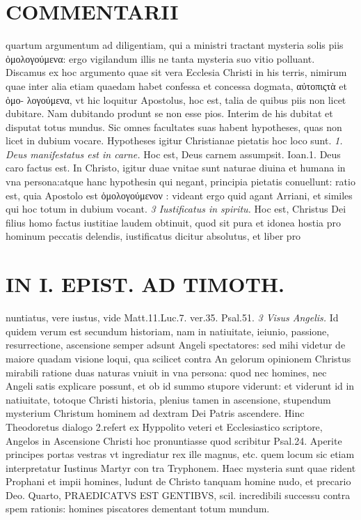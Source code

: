 \documentclass{article}
\begin{document}
\begin{pages}
\section*{COMMENTARII }
\marginpar{[ p.80 ]}\pstart quartum argumentum ad diligentiam, qui a ministri tractant mysteria solis piis ὁμολογούμενα: ergo vigilandum illis ne tanta mysteria suo vitio polluant. Discamus ex hoc argumento quae sit vera Ecclesia Christi in his terris, nimirum quae inter alia etiam quaedam habet confessa et concessa dogmata, αὐτοπιςτὰ et ὁμο- λογούμενα, vt hic loquitur Apostolus, hoc est, talia de quibus piis non licet dubitare. Nam dubitando produnt se non esse pios. Interim de his dubitat et disputat totus mundus. Sic omnes facultates suas habent hypotheses, quas non licet in dubium vocare. Hypotheses igitur Christianae pietatis hoc loco sunt.  \pend
\textit{1. Deus manifestatus est in carne. }\pstart Hoc est, Deus carnem assumpsit. Ioan.1. Deus caro factus est. In Christo, igitur duae vnitae sunt naturae diuina et humana in vna persona:atque hanc hypothesin qui negant, principia pietatis conuellunt: ratio est, quia Apostolo est ὁμολογούμενον : videant ergo quid agant Arriani, et similes qui hoc totum in dubium vocant.  \pend
\textit{3 Iustificatus in spiritu. }\pstart Hoc est, Christus Dei filius homo factus iustitiae laudem obtinuit, quod sit pura et idonea hostia pro hominum peccatis delendis, iustificatus dicitur absolutus, et liber pro\pend
\section*{IN I. EPIST. AD TIMOTH. }
\marginpar{[ p.81 ]}\pstart nuntiatus, vere iustus, vide Matt.11.Luc.7. ver.35. Psal.51.  \pend
\textit{3 Visus Angelis. }\pstart Id quidem verum est secundum historiam, nam in natiuitate, ieiunio, passione, resurrectione, ascensione semper adsunt Angeli spectatores: sed mihi videtur de maiore quadam visione loqui, qua scilicet contra An gelorum opinionem Christus mirabili ratione duas naturas vniuit in vna persona: quod nec homines, nec Angeli satis explicare possunt, et ob id summo stupore viderunt: et viderunt id in natiuitate, totoque Christi historia, plenius tamen in ascensione, stupendum mysterium Christum hominem ad dextram Dei Patris ascendere. Hinc Theodoretus dialogo 2.refert ex Hyppolito veteri et Ecclesiastico scriptore, Angelos in Ascensione Christi hoc pronuntiasse quod scribitur Psal.24. Aperite principes portas vestras vt ingrediatur rex ille magnus, etc. quem locum sic etiam interpretatur Iustinus Martyr con tra Tryphonem. Haec mysteria sunt quae rident Prophani et impii homines, ludunt de Christo tanquam homine nudo, et precario Deo.  \pend\pstart Quarto, PRAEDICATVS EST GENTIBVS, scil. incredibili successu contra spem rationis: homines piscatores dementant totum mundum.  \pend

\end{pages}
\end{document}
